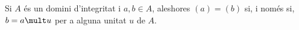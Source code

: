Si $A$ és un domini d'integritat i $a, b \in A$, aleshores $(a) = (b)$ si, i només si, $b = a \mult u$ per a alguna unitat $u$ de $A$.